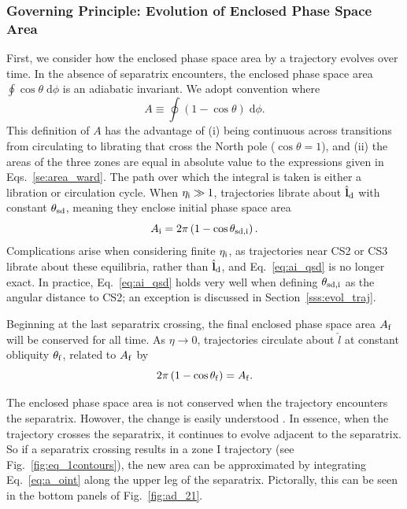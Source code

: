 \documentclass[
        fleqn,
        usenatbib,
    ]{mnras}
\newcommand*{\bm}[1]{\boldsymbol{\mathbf{#1}}}
\newcommand*{\uv}[1]{\hat{\bm{#1}}}
\newcommand*{\p}[1]{\left(#1\right)}
\begin{document}
\subsubsection{Governing Principle: Evolution of Enclosed Phase Space
Area}\label{sss:a_evo}

First, we consider how the enclosed phase space area by a trajectory evolves
over time. In the absence of separatrix encounters, the enclosed phase space
area $\oint \cos\theta \;\mathrm{d}\phi$ is an adiabatic invariant. We adopt
convention where
\begin{equation}
    A \equiv \oint \p{1 - \cos \theta}\;\mathrm{d}\phi.\label{eq:a_oint}
\end{equation}
This definition of $A$ has the advantage of (i) being continuous across
transitions from circulating to librating that cross the North pole ($\cos
\theta = 1$), and (ii) the areas of the three zones are equal in absolute value
to the expressions given in Eqs.~\eqref{se:area_ward}. The path over which the
integral is taken is either a libration or circulation cycle. When $\eta_{\rm i}
\gg 1$, trajectories librate about $\uv{l}_{\rm d}$ with constant $\theta_{\rm
sd}$, meaning they enclose initial phase space area
\begin{equation}
    A_{\rm i} = 2\pi\p{1 - \cos \theta_{\rm sd, i}}.\label{eq:ai_qsd}
\end{equation}
Complications arise when considering finite $\eta_{\rm i}$, as trajectories near
CS2 or CS3 librate about these equilibria, rather than $\uv{l}_{\rm d}$, and
Eq.~\eqref{eq:ai_qsd} is no longer exact. In practice, Eq.~\eqref{eq:ai_qsd}
holds very well when defining $\theta_{\rm sd, i}$ as the angular distance to
CS2; an exception is discussed in Section~\ref{sss:evol_traj}.

Beginning at the last separatrix crossing, the final enclosed phase space area
$A_{\rm f}$ will be conserved for all time. As $\eta \to 0$, trajectories
circulate about $\hat{l}$ at constant obliquity $\theta_{\rm f}$, related to
$A_{\rm f}$ by
\begin{equation}
    2\pi\p{1 - \cos \theta_{\rm f}} = A_{\rm f}. \label{eq:qfaf}
\end{equation}

The enclosed phase space area is not conserved when the trajectory encounters
the separatrix. Howover, the change is easily understood \citep{henrard1982}. In
essence, when the trajectory crosses the separatrix, it continues to evolve
adjacent to the separatrix. So if a separatrix crossing results in a zone I
trajectory (see Fig.~\ref{fig:eq_1contours}), the new area can be approximated
by integrating Eq.~\eqref{eq:a_oint} along the upper leg of the separatrix.
Pictorally, this can be seen in the bottom panels of Fig.~\ref{fig:ad_21}.
\end{document}
